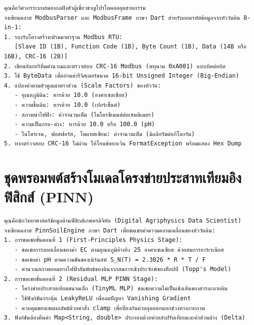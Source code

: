 \begin{promptbox}[title={พรอมพต์ ก.2: การเขียนโมดูลถอดรหัส Modbus RTU และตรวจสอบ CRC-16}]
\begin{lstlisting}
คุณคือวิศวกรระบบสมองกลฝังตัวผู้เชี่ยวชาญโปรโตคอลอุตสาหกรรม
จงเขียนคลาส ModbusParser และ ModbusFrame ภาษา Dart สำหรับถอดรหัสข้อมูลจากหัววัดดิน 8-in-1:
1. รองรับโครงสร้างเฟรมมาตรฐาน Modbus RTU:
   [Slave ID (1B), Function Code (1B), Byte Count (1B), Data (14B หรือ 16B), CRC-16 (2B)]
2. เขียนอัลกอริทึมคำนวณและตรวจสอบ CRC-16 Modbus (พหุนาม 0xA001) แบบบิตต่อบิต
3. ใช้ ByteData เพื่ออ่านค่ารีจิสเตอร์ขนาด 16-bit Unsigned Integer (Big-Endian)
4. แปลงค่าตามตัวคูณมาตราส่วน (Scale Factors) ของหัววัด:
   - อุณหภูมิดิน: หารด้วย 10.0 (องศาเซลเซียส)
   - ความชื้นดิน: หารด้วย 10.0 (เปอร์เซ็นต์)
   - สภาพนำไฟฟ้า: ค่าจำนวนเต็ม (ไมโครซีเมนต์ต่อเซนติเมตร)
   - ความเป็นกรด-ด่าง: หารด้วย 10.0 หรือ 100.0 (pH)
   - ไนโตรเจน, ฟอสฟอรัส, โพแทสเซียม: ค่าจำนวนเต็ม (มิลลิกรัมต่อกิโลกรัม)
5. หากตรวจสอบ CRC-16 ไม่ผ่าน ให้โยนข้อยกเว้น FormatException พร้อมแสดง Hex Dump
\end{lstlisting}
\end{promptbox}

\section{ชุดพรอมพต์สร้างโมเดลโครงข่ายประสาทเทียมอิงฟิสิกส์ (PINN)}

\begin{promptbox}[title={พรอมพต์ ก.3: การสร้างโมเดล Two-Stage Decoupling PINN บนอุปกรณ์ฝังตัว}]
\begin{lstlisting}
คุณคือนักวิทยาศาสตร์ข้อมูลด้านฟิสิกส์เกษตรดิจิทัล (Digital Agriphysics Data Scientist)
จงเขียนคลาส PinnSoilEngine ภาษา Dart เพื่อชดเชยค่าความคลาดเคลื่อนของหัววัดดิน:
1. การชดเชยขั้นตอนที่ 1 (First-Principles Physics Stage):
   - ชดเชยการลอยเลื่อนของค่า EC ตามอุณหภูมิอ้างอิง 25 องศาเซลเซียส ด้วยสมการอาร์เรเนียส
   - ชดเชยค่า pH ตามความชันของเนิร์นสท์ S_N(T) = 2.3026 * R * T / F
   - คำนวณสภาพยอมทางไฟฟ้าสัมพัทธ์ของดินจากสมการเชิงประจักษ์ของท็อปป์ (Topp's Model)
2. การชดเชยขั้นตอนที่ 2 (Residual MLP PINN Stage):
   - โครงข่ายประสาทเทียมขนาดเล็ก (TinyML MLP) ชดเชยความไม่เป็นเชิงเส้นของสารละลายดิน
   - ใช้ฟังก์ชันกระตุ้น LeakyReLU เพื่อลดปัญหา Vanishing Gradient
   - ควบคุมขอบเขตผลลัพธ์ด้วยคำสั่ง clamp เพื่อป้องกันค่าหลุดออกนอกช่วงทางกายภาพ
3. ฟังก์ชันต้องคืนค่า Map<String, double> ประกอบด้วยค่าหลังปรับเทียบและค่าส่วนต่าง (Delta)
\end{lstlisting}
\end{promptbox}

